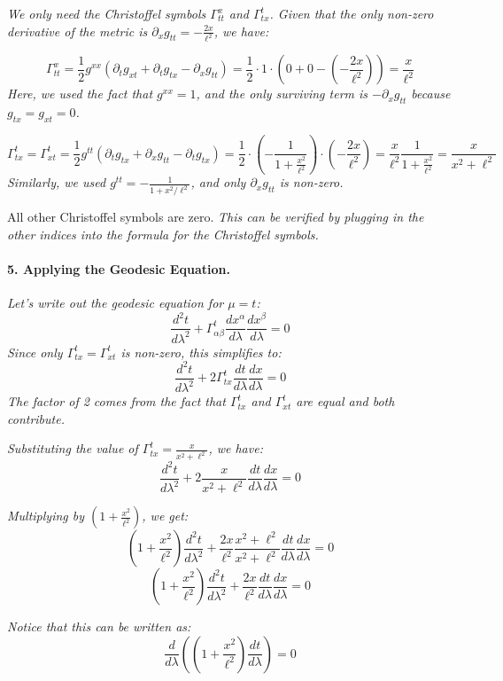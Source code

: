 \documentclass{article}
\begin{document}
\textit{We only need the Christoffel symbols \(\Gamma^x_{tt}\) and \(\Gamma^{t}_{tx}\). Given that the only non-zero derivative of the metric is \(\partial_x g_{tt} = -\frac{2x}{\ell^2}\), we have:}

\[
\Gamma^x_{tt} = \frac{1}{2}g^{xx}(\partial_t g_{xt} + \partial_t g_{tx} - \partial_x g_{tt}) = \frac{1}{2} \cdot 1 \cdot (0 + 0 - (-\frac{2x}{\ell^2})) = \frac{x}{\ell^2}
\]
\emph{Here, we used the fact that \(g^{xx} = 1\), and the only surviving term is \(-\partial_x g_{tt}\) because \(g_{tx} = g_{xt} = 0\).}

\[
\Gamma^t_{tx} = \Gamma^t_{xt} = \frac{1}{2}g^{tt}(\partial_t g_{tx} + \partial_x g_{tt} - \partial_t g_{tx}) = \frac{1}{2} \cdot \left(-\frac{1}{1 + \frac{x^2}{\ell^2}}\right) \cdot (-\frac{2x}{\ell^2}) = \frac{x}{\ell^2} \frac{1}{1 + \frac{x^2}{\ell^2}} = \frac{x}{x^2 + \ell^2}
\]
\emph{Similarly, we used \(g^{tt} = -\frac{1}{1 + x^2/\ell^2}\), and only \(\partial_x g_{tt}\) is non-zero.}

All other Christoffel symbols are zero. \emph{This can be verified by plugging in the other indices into the formula for the Christoffel symbols.}

\paragraph{5. Applying the Geodesic Equation.}

\textit{Let's write out the geodesic equation for \(\mu = t\):}
\[
\frac{d^2t}{d\lambda^2} + \Gamma^t_{\alpha\beta} \frac{dx^\alpha}{d\lambda} \frac{dx^\beta}{d\lambda} = 0
\]
\textit{Since only \(\Gamma^t_{tx} = \Gamma^t_{xt}\) is non-zero, this simplifies to:}
\[
\frac{d^2t}{d\lambda^2} + 2\Gamma^t_{tx} \frac{dt}{d\lambda} \frac{dx}{d\lambda} = 0
\]
\emph{The factor of 2 comes from the fact that \(\Gamma^t_{tx}\) and \(\Gamma^t_{xt}\) are equal and both contribute.}

\textit{Substituting the value of \(\Gamma^t_{tx} = \frac{x}{x^2 + \ell^2}\), we have:}
\[
\frac{d^2t}{d\lambda^2} + 2\frac{x}{x^2 + \ell^2} \frac{dt}{d\lambda} \frac{dx}{d\lambda} = 0
\]

\textit{Multiplying by \((1 + \frac{x^2}{\ell^2})\), we get:}
\[
(1 + \frac{x^2}{\ell^2}) \frac{d^2t}{d\lambda^2} + \frac{2x}{\ell^2} \frac{x^2 + \ell^2}{x^2+\ell^2} \frac{dt}{d\lambda} \frac{dx}{d\lambda} = 0
\]
\[
\left(1 + \frac{x^2}{\ell^2}\right) \frac{d^2 t}{d\lambda^2} + \frac{2x}{\ell^2} \frac{dt}{d\lambda}\frac{dx}{d\lambda} = 0
\]

\textit{Notice that this can be written as:}
\[
\frac{d}{d\lambda} \left( (1 + \frac{x^2}{\ell^2}) \frac{dt}{d\lambda} \right) = 0
\]
\end{document}
